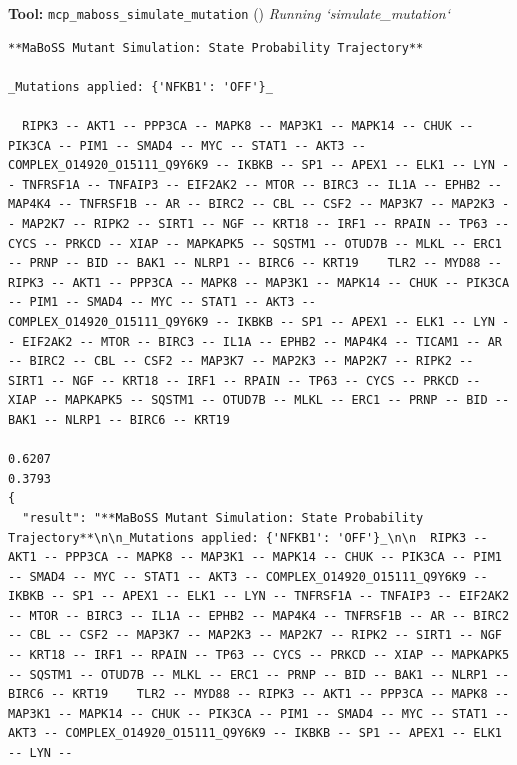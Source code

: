 \documentclass[11pt,a4paper]{article}
\begin{document}
\begin{toolokbox}
\textbf{Tool:} \texttt{mcp\_maboss\_simulate\_mutation} (\checkmark)
\textit{Running `simulate\_mutation`}
\begin{lstlisting}
**MaBoSS Mutant Simulation: State Probability Trajectory**

_Mutations applied: {'NFKB1': 'OFF'}_

  RIPK3 -- AKT1 -- PPP3CA -- MAPK8 -- MAP3K1 -- MAPK14 -- CHUK -- PIK3CA -- PIM1 -- SMAD4 -- MYC -- STAT1 -- AKT3 -- COMPLEX_O14920_O15111_Q9Y6K9 -- IKBKB -- SP1 -- APEX1 -- ELK1 -- LYN -- TNFRSF1A -- TNFAIP3 -- EIF2AK2 -- MTOR -- BIRC3 -- IL1A -- EPHB2 -- MAP4K4 -- TNFRSF1B -- AR -- BIRC2 -- CBL -- CSF2 -- MAP3K7 -- MAP2K3 -- MAP2K7 -- RIPK2 -- SIRT1 -- NGF -- KRT18 -- IRF1 -- RPAIN -- TP63 -- CYCS -- PRKCD -- XIAP -- MAPKAPK5 -- SQSTM1 -- OTUD7B -- MLKL -- ERC1 -- PRNP -- BID -- BAK1 -- NLRP1 -- BIRC6 -- KRT19    TLR2 -- MYD88 -- RIPK3 -- AKT1 -- PPP3CA -- MAPK8 -- MAP3K1 -- MAPK14 -- CHUK -- PIK3CA -- PIM1 -- SMAD4 -- MYC -- STAT1 -- AKT3 -- COMPLEX_O14920_O15111_Q9Y6K9 -- IKBKB -- SP1 -- APEX1 -- ELK1 -- LYN -- EIF2AK2 -- MTOR -- BIRC3 -- IL1A -- EPHB2 -- MAP4K4 -- TICAM1 -- AR -- BIRC2 -- CBL -- CSF2 -- MAP3K7 -- MAP2K3 -- MAP2K7 -- RIPK2 -- SIRT1 -- NGF -- KRT18 -- IRF1 -- RPAIN -- TP63 -- CYCS -- PRKCD -- XIAP -- MAPKAPK5 -- SQSTM1 -- OTUD7B -- MLKL -- ERC1 -- PRNP -- BID -- BAK1 -- NLRP1 -- BIRC6 -- KRT19
                                                                                                                                                                                                                                                                                                                                                                                                                                                                                                                               0.6207                                                                                                                                                                                                                                                                                                                                                                                                                                                                                                                         0.3793
{
  "result": "**MaBoSS Mutant Simulation: State Probability Trajectory**\n\n_Mutations applied: {'NFKB1': 'OFF'}_\n\n  RIPK3 -- AKT1 -- PPP3CA -- MAPK8 -- MAP3K1 -- MAPK14 -- CHUK -- PIK3CA -- PIM1 -- SMAD4 -- MYC -- STAT1 -- AKT3 -- COMPLEX_O14920_O15111_Q9Y6K9 -- IKBKB -- SP1 -- APEX1 -- ELK1 -- LYN -- TNFRSF1A -- TNFAIP3 -- EIF2AK2 -- MTOR -- BIRC3 -- IL1A -- EPHB2 -- MAP4K4 -- TNFRSF1B -- AR -- BIRC2 -- CBL -- CSF2 -- MAP3K7 -- MAP2K3 -- MAP2K7 -- RIPK2 -- SIRT1 -- NGF -- KRT18 -- IRF1 -- RPAIN -- TP63 -- CYCS -- PRKCD -- XIAP -- MAPKAPK5 -- SQSTM1 -- OTUD7B -- MLKL -- ERC1 -- PRNP -- BID -- BAK1 -- NLRP1 -- BIRC6 -- KRT19    TLR2 -- MYD88 -- RIPK3 -- AKT1 -- PPP3CA -- MAPK8 -- MAP3K1 -- MAPK14 -- CHUK -- PIK3CA -- PIM1 -- SMAD4 -- MYC -- STAT1 -- AKT3 -- COMPLEX_O14920_O15111_Q9Y6K9 -- IKBKB -- SP1 -- APEX1 -- ELK1 -- LYN -- 

\end{lstlisting}
\end{toolokbox}
\end{document}
